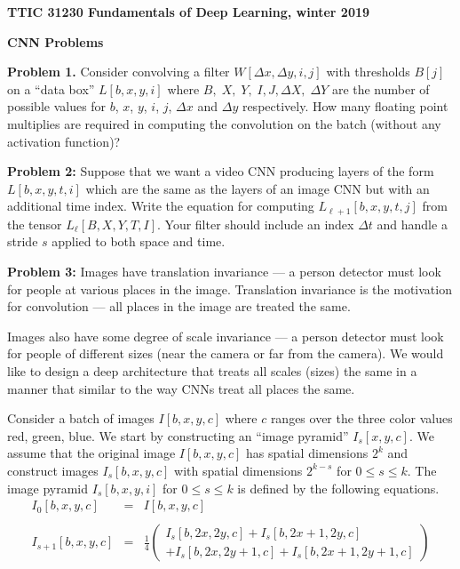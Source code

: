 \documentclass{article}
\newcommand{\solution}[1]{\bigskip {\color{red} {\bf Solution}: #1}}
\begin{document}
\centerline{\bf TTIC 31230 Fundamentals of Deep Learning, winter 2019}

\medskip
\centerline{\bf CNN Problems}

\bigskip
{\bf Problem 1.}  Consider convolving a filter $W[\Delta x, \Delta y, i,j]$  with thresholds $B[j]$ on a ``data box'' $L[b,x,y,i]$ where $B,\;X,\;Y,\;I, J,\Delta X,\;\Delta Y$
are the number of possible values for $b$, $x$, $y$, $i$, $j$, $\Delta x$ and $\Delta y$ respectively.
How many floating point multiplies are required
in computing the convolution on the batch (without any activation function)?

\solution{$$BXY\;\Delta X\;\Delta Y \;IJ$$}

\bigskip
{\bf Problem 2:} Suppose that we want a video CNN producing layers of the form $L[b,x,y,t,i]$ which are the same as the layers of an image CNN but with an additional time index.
Write the equation for computing $L_{\ell+1}[b,x,y,t,j]$ from the tensor $L_\ell[B,X,Y,T,I]$.  Your filter should include an index $\Delta t$ and handle a stride $s$ applied
to both space and time.

\solution{
  $$L_{\ell + 1}[b,x,y,t,j] = \sum_{\Delta x, \Delta y, \Delta t, i} W[\Delta x, \Delta y, \Delta t, i, j] L_\ell[b, sx+ \Delta x, sy + \Delta y, st + \Delta t, i,j]$$
  }

\bigskip
{\bf Problem 3:} Images have translation invariance --- a person detector must look for people at various places in the image.  Translation invariance is the motivation for
convolution --- all places in the image are treated the same.

\medskip
Images also have some degree of scale invariance --- a person detector must look for people of different sizes
(near the camera or far from the camera).  We would like to design a deep architecture that treats all scales (sizes) the same in a manner that similar to the way CNNs
treat all places the same.

\medskip
Consider a batch of images
$I[b,x,y,c]$ where $c$ ranges over the three color values red, green, blue. We start by constructing an ``image pyramid'' $I_s[x,y,c]$.
We assume that the original image $I[b,x,y,c]$ has spatial dimensions $2^k$ and construct images $I_s[b,x,y,c]$ with spatial dimensions $2^{k-s}$
for $0 \leq s \leq k$.  The image pyramid $I_s[b,x,y,i]$ for $0 \leq s \leq k$ is defined by the following equations.
\begin{eqnarray*}
  I_0[b,x,y,c] & = & I[b,x,y,c] \\
  \\
  I_{s+1}[b,x,y,c] & = & \frac{1}{4}\left(\begin{array}{l} I_s[b,2x,2y,c] + I_s[b,2x+1,2y,c] \\ + I_s[b,2x,2y+1,c] + I_s[b,2x+1,2y+1,c]\end{array}\right)
\end{eqnarray*}
\end{document}

